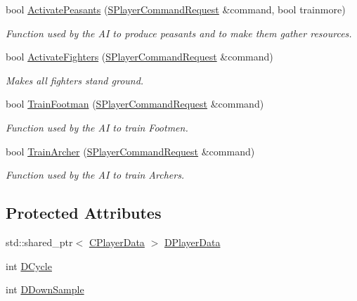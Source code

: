 \begin{DoxyCompactItemize}
bool \hyperlink{classCAIPlayer_a3fab1c955fd68bb53fa80bb1872d2819}{Activate\+Peasants} (\hyperlink{structSPlayerCommandRequest}{S\+Player\+Command\+Request} \&command, bool trainmore)
\begin{DoxyCompactList}\small\item\em Function used by the AI to produce peasants and to make them gather resources. \end{DoxyCompactList}\item 
bool \hyperlink{classCAIPlayer_a4216d7e76315234a4fe22fb3a0a89c1d}{Activate\+Fighters} (\hyperlink{structSPlayerCommandRequest}{S\+Player\+Command\+Request} \&command)
\begin{DoxyCompactList}\small\item\em Makes all fighters stand ground. \end{DoxyCompactList}\item 
bool \hyperlink{classCAIPlayer_aa3f9c1d0d449a45a24e065d2086527b0}{Train\+Footman} (\hyperlink{structSPlayerCommandRequest}{S\+Player\+Command\+Request} \&command)
\begin{DoxyCompactList}\small\item\em Function used by the AI to train Footmen. \end{DoxyCompactList}\item 
bool \hyperlink{classCAIPlayer_af2edf1e3c54d6af693f768f86d484fd6}{Train\+Archer} (\hyperlink{structSPlayerCommandRequest}{S\+Player\+Command\+Request} \&command)
\begin{DoxyCompactList}\small\item\em Function used by the AI to train Archers. \end{DoxyCompactList}\end{DoxyCompactItemize}
\subsection*{Protected Attributes}
\begin{DoxyCompactItemize}
\item 
std\+::shared\+\_\+ptr$<$ \hyperlink{classCPlayerData}{C\+Player\+Data} $>$ \hyperlink{classCAIPlayer_a83b5113c8f7e80df54940b647c5ee2e6}{D\+Player\+Data}
\item 
int \hyperlink{classCAIPlayer_adf12a7afe7ea86410b18eff47fa95253}{D\+Cycle}
\item 
int \hyperlink{classCAIPlayer_a091aed92cb9ad1a789900a6394d2f352}{D\+Down\+Sample}
\end{DoxyCompactItemize}


